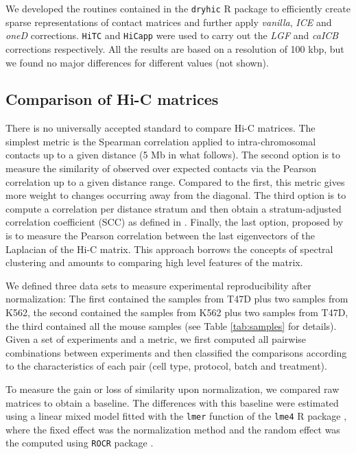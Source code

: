 \documentclass{bioinfo}
\begin{document}
\begin{methods}
We developed the routines contained in the \texttt{dryhic} R package to
efficiently create sparse representations of contact matrices and further
apply \textit{vanilla}, \textit{ICE} and \textit{oneD} corrections.
\texttt{HiTC} \citep{servant2012hitc} and \texttt{HiCapp}
\citep{wu2016computational} were used to carry out the \textit{LGF} and
\textit{caICB} corrections respectively. All the results are based on a
resolution of 100 kbp, but we found no major differences for different
values (not shown).



\subsection{Comparison of Hi-C matrices}
\label{sec:comp}

There is no universally accepted standard to compare Hi-C matrices. The
simplest metric is the Spearman correlation applied to intra-chromosomal
contacts up to a given distance (5 Mb in what follows). The second option
is to measure the similarity of observed over expected contacts via the
Pearson correlation up to a given distance range. Compared to the first,
this metric gives more weight to changes occurring away from the diagonal.
The third option is to compute a correlation per distance stratum and then
obtain a stratum-adjusted correlation coefficient (SCC) as defined in
\cite{yang2017hicrep}. Finally, the last option, proposed by
\cite{yan2017hicspector} is to measure the Pearson correlation between the
last eigenvectors of the Laplacian of the Hi-C matrix. This approach
borrows the concepts of spectral clustering \citep{von2007tutorial} and
amounts to comparing high level features of the matrix.

We defined three data sets to measure experimental reproducibility after
normalization: The first contained the samples from T47D plus two samples
from K562, the second contained the samples from K562 plus two samples
from T47D, the third contained all the mouse samples (see Table
\ref{tab:samples} for details). Given a set of experiments and a metric,
we first computed all pairwise combinations between experiments and then
classified the comparisons according to the characteristics of each pair
(cell type, protocol, batch and treatment).

To measure the gain or loss of similarity upon normalization, we compared
raw matrices to obtain a baseline. The differences with this baseline were
estimated using a linear mixed model fitted with the \texttt{lmer}
function of the \texttt{lme4} R package \citep{bates2015lme4}, where the
fixed effect was the normalization method and the random effect was the
computed using \texttt{ROCR} package \citep{sing2005rocr}.


\end{methods}
\end{document}
